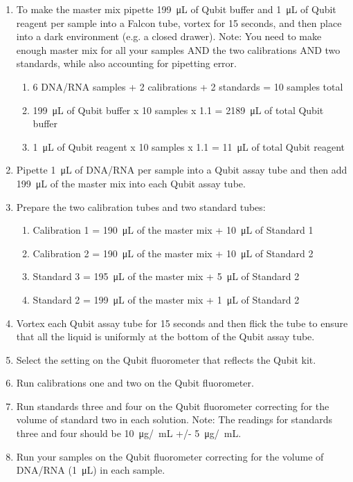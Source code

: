 \documentclass[a4paper,12pt]{article}
\begin{document}
\begin{enumerate}

\item To make the master mix pipette \SI{199}{\micro\liter} of Qubit buffer and \SI{1}{\micro\liter} of Qubit reagent per sample into a Falcon tube, vortex for 15 seconds, and then place into a dark environment (e.g. a closed drawer). Note: You need to make enough master mix for all your samples AND the two calibrations AND two standards, while also accounting for pipetting error. 
\begin{enumerate}
\item 6 DNA/RNA samples + 2 calibrations + 2 standards = 10 samples total
\item \SI{199}{\micro\liter} of Qubit buffer x 10 samples x 1.1 = \SI{2189}{\micro\liter} of total Qubit buffer
\item \SI{1}{\micro\liter} of Qubit reagent x 10 samples x 1.1 = \SI{11}{\micro\liter} of total Qubit reagent 
\end{enumerate}
\item Pipette \SI{1}{\micro\liter} of DNA/RNA per sample into a Qubit assay tube and then add \SI{199}{\micro\liter} of the master mix into each Qubit assay tube. 
\item Prepare the two calibration tubes and two standard tubes:
\begin{enumerate}
\item Calibration 1 = \SI{190}{\micro\liter} of the master mix + \SI{10}{\micro\liter} of Standard 1
\item Calibration 2 = \SI{190}{\micro\liter} of the master mix + \SI{10}{\micro\liter} of Standard 2
\item Standard 3 = \SI{195}{\micro\liter} of the master mix + \SI{5}{\micro\liter} of Standard 2
\item Standard 2 = \SI{199}{\micro\liter} of the master mix + \SI{1}{\micro\liter} of Standard 2
\end{enumerate}
\item Vortex each Qubit assay tube for 15 seconds and then flick the tube to ensure that all the liquid is uniformly at the bottom of the Qubit assay tube. 
\item Select the setting on the Qubit fluorometer that reflects the Qubit kit.
\item Run calibrations one and two on the Qubit fluorometer. 
\item Run standards three and four on the Qubit fluorometer correcting for the volume of standard two in each solution. Note: The readings for standards three and four should be \SI{10}{\micro\gram}/\SI{}{\milli\liter} +/- \SI{5}{\micro\gram}/\SI{}{\milli\liter}.
\item Run your samples on the Qubit fluorometer correcting for the volume of DNA/RNA (\SI{1}{\micro\liter}) in each sample.
\end{enumerate}
\end{document}
